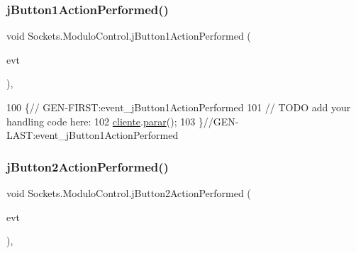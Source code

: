 \mbox{\label{class_sockets_1_1_modulo_control_ae864493081b3e1283a46cdc204ce5901}} 
\subsubsection{\texorpdfstring{j\+Button1\+Action\+Performed()}{jButton1ActionPerformed()}}
{\footnotesize\ttfamily void Sockets.\+Modulo\+Control.\+j\+Button1\+Action\+Performed (\begin{DoxyParamCaption}\item[{java.\+awt.\+event.\+Action\+Event}]{evt }\end{DoxyParamCaption})\hspace{0.3cm}{\ttfamily [inline]}, {\ttfamily [private]}}


\begin{DoxyCode}
100                                                                          \{\textcolor{comment}{//
      GEN-FIRST:event\_jButton1ActionPerformed}
101         \textcolor{comment}{// TODO add your handling code here:}
102         \mbox{\hyperlink{class_sockets_1_1_modulo_control_ae24879f5b211f987267a002a09329415}{cliente}}.\mbox{\hyperlink{class_sockets_1_1_cliente_aef765880b11e7868501bfff2fa4000f6}{parar}}();
103     \}\textcolor{comment}{//GEN-LAST:event\_jButton1ActionPerformed}
\end{DoxyCode}
\mbox{\label{class_sockets_1_1_modulo_control_a015a69f71af71f04bd6ebd98ff9256ce}} 
\subsubsection{\texorpdfstring{j\+Button2\+Action\+Performed()}{jButton2ActionPerformed()}}
{\footnotesize\ttfamily void Sockets.\+Modulo\+Control.\+j\+Button2\+Action\+Performed (\begin{DoxyParamCaption}\item[{java.\+awt.\+event.\+Action\+Event}]{evt }\end{DoxyParamCaption})\hspace{0.3cm}{\ttfamily [inline]}, {\ttfamily [private]}}


